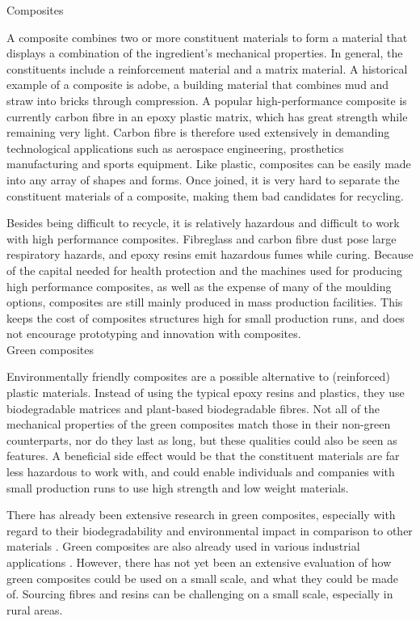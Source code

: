 \documentclass[]{report}
\begin{document}
{\sc Composites}

A composite combines two or more constituent materials to form a material that displays a combination of the ingredient's mechanical properties.  In general, the constituents include a reinforcement material and a matrix material.  A historical example of a composite is adobe, a building material that combines mud and straw into bricks through compression.  A popular high-performance composite is currently carbon fibre in an epoxy plastic matrix, which has great strength while remaining very light.  Carbon fibre is therefore used extensively in demanding technological applications such as aerospace engineering, prosthetics manufacturing and sports equipment.  Like plastic, composites can be easily made into any array of shapes and forms.  Once joined, it is very hard to separate the constituent materials of a composite, making them bad candidates for recycling.

Besides being difficult to recycle, it is relatively hazardous and difficult to work with high performance composites.  Fibreglass and carbon fibre dust pose large respiratory hazards, and epoxy resins emit hazardous fumes while curing.  Because of the capital needed for health protection and the machines used for producing high performance composites,  as well as the expense of many of the moulding options, composites are still mainly produced in mass production facilities.  This keeps the cost of composites structures high for small production runs, and does not encourage prototyping and innovation with composites.\\

{\sc Green composites}

Environmentally friendly composites are a possible alternative to (reinforced) plastic materials.  Instead of using the typical epoxy resins and plastics, they use biodegradable matrices and plant-based biodegradable fibres.   Not all of the mechanical properties of the green composites match those in their non-green counterparts, nor do they last as long, but these qualities could also be seen as features.  A beneficial side effect would be that the constituent materials are far less hazardous to work with, and could enable individuals and companies with small production runs to use high strength and low weight materials.  

There has already been extensive research in green composites, especially with regard to their biodegradability and environmental impact in comparison to other materials \cite{mohanty, greencomposites}.  Green composites are also already used in various industrial applications \cite{use}.  However, there has not yet been an extensive evaluation of how green composites could be used on a small scale, and what they could be made of.  Sourcing fibres and resins can be challenging on a small scale, especially in rural areas.\\
\end{document}
